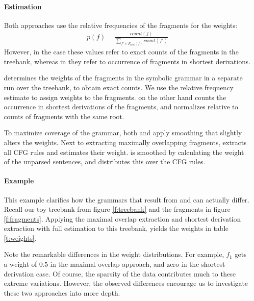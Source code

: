 \paragraph{Estimation}

Both approaches use the relative frequencies of the fragments for the weights:
\begin{align}p(f)=\frac{count(f)}{\sum_{f'\in F_{root}(f)} count(f')}\end{align} 
However, in the \ddop{} case these values refer to exact counts of the fragments in the treebank, whereas in \dops{} they refer to occurrence of fragments in shortest derivations.


\ddop{} determines the weights of the fragments in the symbolic grammar in a separate run over the treebank, to obtain exact counts. We use the relative frequency estimate to assign weights to the fragments. \dops{} on the other hand counts the occurrence in shortest derivations of the fragments, and normalizes relative to counts of fragments with the same root.

To maximize coverage of the grammar, both \ddop{} and \dops{} apply smoothing that slightly alters the weights. Next to extracting maximally overlapping fragments, \ddop{} extracts all CFG rules and estimates their weight. \dops{} is smoothed by calculating the weight of the unparsed sentences, and distributes this over the CFG rules.





\paragraph{Example}
\FloatBarrier
This example clarifies how the grammars that result from \ddop{} and \dops{} can actually differ. Recall our toy treebank from figure \ref{f:treebank} and the fragments in figure \ref{f:fragments}. 
Applying the maximal overlap extraction and shortest derivation extraction with full estimation to this treebank, yields the weights in table \ref{t:weights}.

Note the remarkable differences in the weight distributions. For example, $f_1$ gets a weight of 0.5 in the maximal overlap approach, and zero in the shortest derivation case. Of course, the sparsity of the data contributes much to these extreme variations. However, the observed differences encourage us to investigate these two approaches into more depth.



